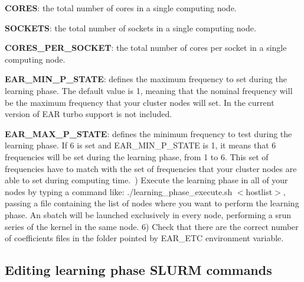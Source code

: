 \begin{DoxyItemize}
\item {\bfseries C\+O\+R\+ES}\+: the total number of cores in a single computing node.~\newline

\item {\bfseries S\+O\+C\+K\+E\+TS}\+: the total number of sockets in a single computing node.~\newline

\item {\bfseries C\+O\+R\+E\+S\+\_\+\+P\+E\+R\+\_\+\+S\+O\+C\+K\+ET}\+: the total number of cores per socket in a single computing node.~\newline

\item {\bfseries E\+A\+R\+\_\+\+M\+I\+N\+\_\+\+P\+\_\+\+S\+T\+A\+TE}\+: defines the maximum frequency to set during the learning phase. The default value is 1, meaning that the nominal frequency will be the maximum frequency that your cluster nodes will set. In the current version of E\+AR turbo support is not included.~\newline

\item {\bfseries E\+A\+R\+\_\+\+M\+A\+X\+\_\+\+P\+\_\+\+S\+T\+A\+TE}\+: defines the minimum frequency to test during the learning phase. If 6 is set and E\+A\+R\+\_\+\+M\+I\+N\+\_\+\+P\+\_\+\+S\+T\+A\+TE is 1, it means that 6 frequencies will be set during the learning phase, from 1 to 6. This set of frequencies have to match with the set of frequencies that your cluster nodes are able to set during computing time.~) Execute the learning phase in all of your nodes by typing a command like\+: {\ttfamily ./learning\+\_\+phase\+\_\+execute.sh $<$hostlist$>$}, passing a file containing the list of nodes where you want to perform the learning phase. An {\ttfamily sbatch} will be launched exclusively in every node, performing a {\ttfamily srun} series of the kernel in the same node. 6) Check that there are the correct number of coefficients files in the folder pointed by {\ttfamily E\+A\+R\+\_\+\+E\+TC} environment variable.
\end{DoxyItemize}

\subsection*{Editing learning phase S\+L\+U\+RM commands }